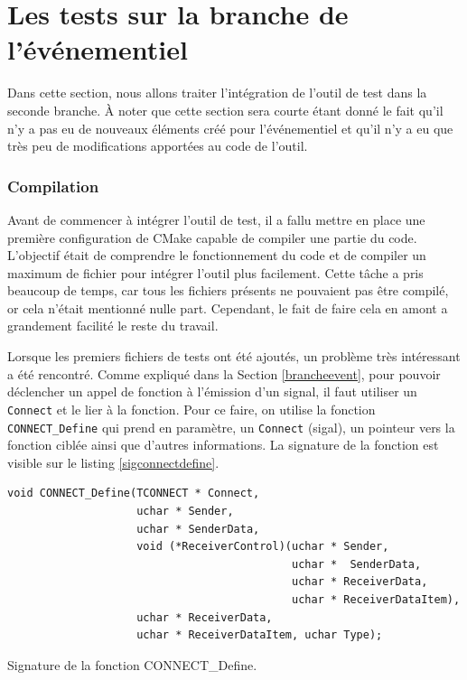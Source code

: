\documentclass[a4paper]{article}
\begin{document}
\section{Les tests sur la branche de l'événementiel}%

Dans cette section, nous allons traiter l'intégration de l'outil de test dans la
seconde branche. À noter que cette section sera courte étant donné le fait qu'il
n'y a pas eu de nouveaux éléments créé pour l'événementiel et qu'il n'y a eu que
très peu de modifications apportées au code de l'outil.

\subsubsection*{Compilation}

Avant de commencer à intégrer l'outil de test, il a fallu mettre en place une
première configuration de CMake capable de compiler une partie du code.
L'objectif était de comprendre le fonctionnement du code et de compiler un
maximum de fichier pour intégrer l'outil plus facilement. Cette tâche a pris
beaucoup de temps, car tous les fichiers présents ne pouvaient pas être compilé,
or cela n'était mentionné nulle part. Cependant, le fait de faire cela en amont a
grandement facilité le reste du travail.

Lorsque les premiers fichiers de tests ont été ajoutés, un problème très
intéressant a été rencontré. Comme expliqué dans la Section \ref{brancheevent},
pour pouvoir déclencher un appel de fonction à l'émission d'un signal, il faut
utiliser un \verb|Connect| et le lier à la fonction. Pour ce faire, on utilise
la fonction \verb|CONNECT_Define| qui prend en paramètre, un \verb|Connect|
(sigal), un pointeur vers la fonction ciblée ainsi que d'autres informations. La
signature de la fonction est visible sur le listing \ref{sigconnectdefine}.

\begin{listing}[ht!]
\begin{verbatim}
void CONNECT_Define(TCONNECT * Connect,
                    uchar * Sender,
                    uchar * SenderData,
                    void (*ReceiverControl)(uchar * Sender,
                                            uchar *  SenderData,
                                            uchar * ReceiverData,
                                            uchar * ReceiverDataItem),
                    uchar * ReceiverData,
                    uchar * ReceiverDataItem, uchar Type);
\end{verbatim}
\caption{Signature de la fonction CONNECT\_Define.}
\label{sigconnectdefine}
\end{listing}
\end{document}
